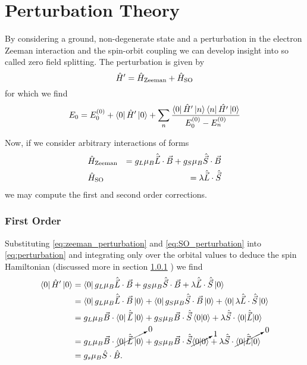 \section{Perturbation Theory}
By considering a ground, non-degenerate state and a perturbation in the electron Zeeman interaction and the spin-orbit coupling we can develop insight into so called zero field splitting. The perturbation is given by 
\begin{equation}
    \hat{H}' = \hat{H}_{\ce{Zeeman}} + \hat{H}_{\ce{SO}}  
\end{equation}
for which we find 
\begin{equation}
    E_0 = E^{(0)}_0 + \bra{0}{\hat{H}'}\ket{0}  + \sum_{n}\frac{\bra{0} \hat{H}' \ket{n} \bra{n} \hat{H'}\ket{0}}{E_0^{(0)} - E_n^{(0)}}
    \label{eq:perturbation}
\end{equation}

Now, if we consider arbitrary interactions of forms
\begin{eqnarray}
    &\hat{H}_{\ce{Zeeman}} &= g_L \mu_B \hat{\vec{L}}\cdot\vec{B} + g_S \mu_B \hat{\vec{S}}\cdot\vec{B} \label{eq:zeeman_perturbation}\\ 
    & \hat{H}_{\ce{SO}} &= \lambda\hat{\vec{L}}\cdot \hat{\vec{S}} \label{eq:SO_perturbation}
\end{eqnarray}
we may compute the first and second order corrections. 


\subsubsection{First Order}
Substituting \ref{eq:zeeman_perturbation} and \ref{eq:SO_perturbation} into \ref{eq:perturbation} and integrating only over the orbital values to deduce the spin Hamiltonian (discussed more in section \ref{} ) we find
\begin{equation}
   \begin{align}
       \bra{0} \hat{H}' \ket{0} &= \bra{0} g_L \mu_B \hat{\vec{L}}\cdot \vec{B} + g_S \mu_B \hat{\vec{S}}\cdot \vec{B} + \lambda\hat{\vec{L}} \cdot \hat{\vec{S}} \ket{0}\\ 
                                & = \bra{0} g_L\mu_B \hat{\vec{L}} \cdot \vec{B} \ket{0} + \bra{0}g_S \mu_B \hat{\vec{S}}\cdot \vec{B}\ket{0} + \bra{0}\lambda\hat{\vec{L}} \cdot \hat{\vec{S}} \ket{0}\\
                                &= g_L\mu_B \vec{B} \cdot \bra{0}\hat{\vec{L}}\ket{0} + g_S \mu_B  \vec{B} \cdot \hat{\vec{S}}\braket{0|0} + \lambda \hat{\vec{S}} \cdot \braket{0|\hat{\vec{L}}|0}\\ 
                                &= g_L\mu_B \vec{B} \cdot \cancelto{0}{\bra{0}\hat{\vec{L}}\ket{0}} + g_S \mu_B  \vec{B} \cdot \hat{\vec{S}}\cancelto{1}{\braket{0|0}} + \lambda \hat{\vec{S}} \cdot \cancelto{0}{\braket{0|\hat{\vec{L}}|0}}\\ 
                                &= g_s \mu_B \hat{S}\cdot\hat{B}.
   \end{align} 
    \label{eq:first_order}
\end{equation}

